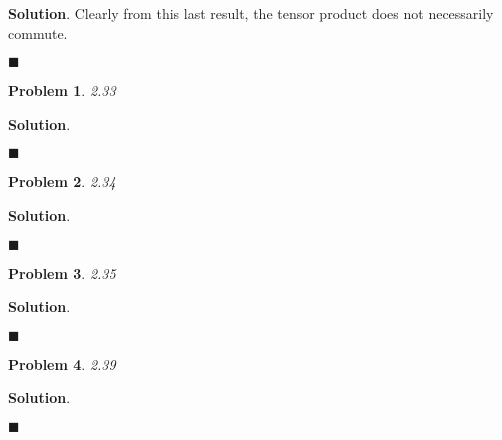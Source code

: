 \documentclass[12pt]{article}
\newtheorem{p}{Problem}
\theoremstyle{definition}
\newenvironment{s}{%
        \begin{trivlist} \item \textbf{Solution}. }{%
            \hspace*{\fill} $\blacksquare$\end{trivlist}}%
\begin{document}
{\begin{s}
Clearly from this last result, the tensor product does not necessarily commute.

\end{s}

\begin{p}
2.33
\end{p}

\begin{s}

\end{s}

\begin{p}
2.34
\end{p}

\begin{s}

\end{s}

\begin{p}
2.35
\end{p}

\begin{s}

\end{s}

\begin{p}
2.39
\end{p}

\begin{s}

\end{s}
\end{document}

